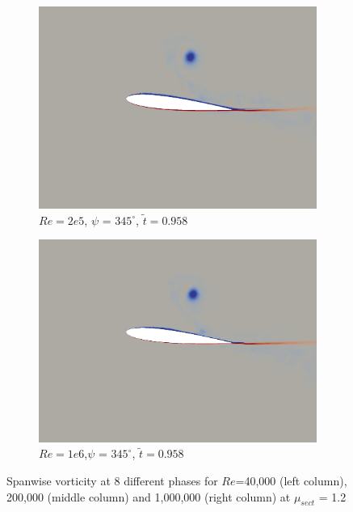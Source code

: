 \begin{figure}[H]
\begin{subfigure}[b]{0.32\textwidth}
		\includegraphics[width=1\textwidth]{figures/Vorticity_plots/Re_200k_1pt2/phase_345.png}
		\caption{$Re=2e5$, $\psi$ = $345^\circ$, $\tilde{t}=0.958$}
		\label{fig:Re_200k_1pt2_phi345}
	\end{subfigure}
	\begin{subfigure}[b]{0.32\textwidth}
		\centering
		\includegraphics[width=1\textwidth]{figures/Vorticity_plots/Re_1m_1pt2/phase_345.png}
		\caption{$Re=1e6$,$\psi$ = $345^\circ$, $\tilde{t}=0.958$}
		\label{fig:Re_1m_1pt2_phi345}
	\end{subfigure}
	
	\caption{Spanwise vorticity at 8 different phases for $Re$=40,000 (left column), 200,000 (middle column) and 1,000,000 (right column) at $\mu_{sect}$ = 1.2}
	\label{fig:vortScreen_1pt2}
\end{figure}

